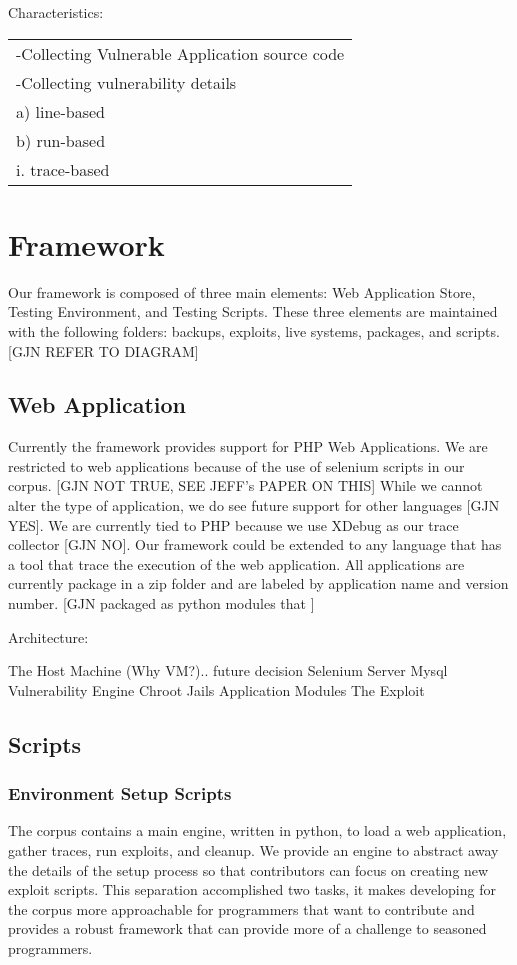 \documentclass[letterpaper,twocolumn,10pt]{article}
\begin{document}
Characteristics:\\
 \begin{tabular} { l }
   -Collecting Vulnerable Application source code\\
   -Collecting vulnerability details\\
     a) line-based\\
     b) run-based\\
      i. trace-based\\
 \end{tabular}



\section{Framework}

Our framework is composed of three main elements: Web Application Store, Testing Environment, and Testing Scripts.  These three elements are maintained with the following folders: backups, exploits, live systems, packages, and scripts. [GJN REFER TO DIAGRAM]

\subsection{Web Application}
Currently the framework provides support for PHP Web Applications.  We are restricted to web applications because of the use of selenium scripts in our corpus. [GJN NOT TRUE, SEE JEFF's PAPER ON THIS]  While we cannot alter the type of application, we do see future support for other languages [GJN YES].  We are currently tied to PHP because we use XDebug as our trace collector [GJN NO].  Our framework could be extended to any language that has a tool that trace the execution of the web application.  
All applications are currently package in a zip folder and are labeled by application name and version number. [GJN packaged as python modules that ]  

Architecture:

  The Host Machine
    (Why VM?).. future decision
    Selenium Server
    Mysql
  Vulnerability Engine
    Chroot Jails
    Application Modules
    The Exploit

\subsection{Scripts}

\subsubsection{Environment Setup Scripts}
The corpus contains a main engine, written in python, to load a web application, gather traces, run exploits, and cleanup.  We provide an engine to abstract away the details of the setup process so that contributors can focus on creating new exploit scripts.  This separation accomplished two tasks, it makes developing for the corpus more approachable for programmers that want to contribute and provides a robust framework that can provide more of a challenge to seasoned programmers.
\end{document}
